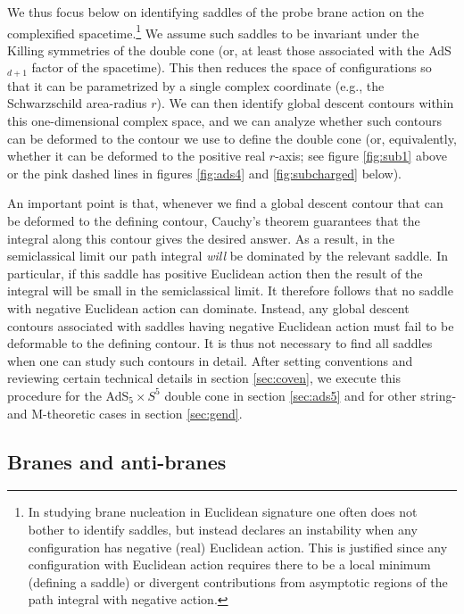 \documentclass[11pt]{article}
\begin{document}
We thus focus below on identifying saddles of the probe brane action on the complexified spacetime.\footnote{
    In studying brane nucleation in Euclidean signature one often does not bother to identify saddles, but instead declares an instability when any configuration has negative (real) Euclidean action.
    This is justified since any configuration with Euclidean action requires there to be a local minimum (defining a saddle) or divergent contributions from asymptotic regions of the path integral with negative action.
}
We assume such saddles to be invariant under the Killing symmetries of the double cone (or, at least those associated with the AdS$_{d+1}$  factor of the spacetime).
This then reduces the space of configurations so that it can be parametrized by a single complex coordinate (e.g., the Schwarzschild area-radius $r$).
We can then identify global descent contours within this one-dimensional complex space, and we can analyze whether such contours can be deformed to the contour we use to define the double cone (or, equivalently, whether it can be deformed to the positive real $r$-axis; see figure \ref{fig:sub1} above or the pink dashed lines in figures \ref{fig:ads4} and \ref{fig:subcharged} below).

An important point is that, whenever we find a global descent contour that can be deformed to the defining contour, Cauchy's theorem guarantees that the integral along this contour gives the desired answer. 
As a result, in the semiclassical limit our path integral {\it will} be dominated by the relevant saddle.  
In particular, if this saddle has positive Euclidean action then the result of the integral will be small in the semiclassical limit.  
It therefore follows that no saddle with negative Euclidean action can dominate.  
Instead, any global descent contours associated with saddles having negative Euclidean action must fail to be deformable to the defining contour.  
It is thus not necessary to find all saddles when one can study such contours in detail.
After setting conventions and reviewing certain technical details in section \ref{sec:coven}, we execute this procedure for the AdS$_5\times S^5$ double cone in section \ref{sec:ads5} and for other string- and M-theoretic cases in section \ref{sec:gend}.

\subsection{Branes and anti-branes}
\label{sec:bab}
\end{document}
